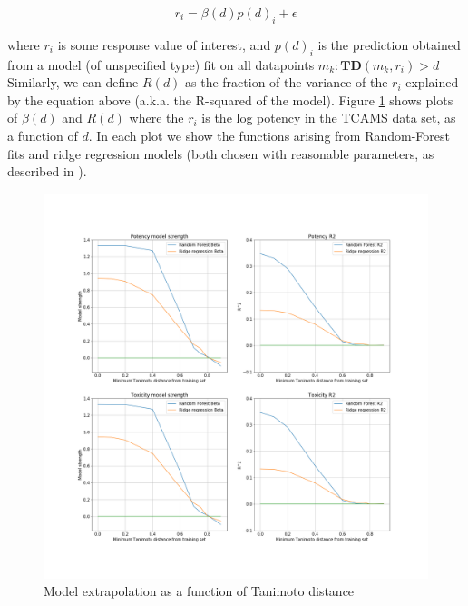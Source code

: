 \documentclass[journal=jacsat,manuscript=article]{achemso}
\begin{document}
\begin{equation}
    r_{i} = \beta(d) p(d)_{i} + \epsilon
\end{equation}

where $r_{i}$ is some response value of interest, and $p(d)_{i}$ is the prediction obtained from a model (of unspecified type) fit on all datapoints $m_{k} : \mathbf{TD}(m_{k}, r_{i}) > d$
\newline
\newline
Similarly, we can define $R(d)$ as the fraction of the variance  of the $r_{i}$ explained by the equation above  (a.k.a. the R-squared of the model).
\newline
\newline
Figure \ref{fig:model_extrap} shows plots of $\beta(d)$ and $R(d)$ where the $r_{i}$ is the log potency in the TCAMS data set, as a function of $d$.  In each plot we show the functions arising from Random-Forest fits and ridge regression models (both chosen with reasonable parameters, as described in \citep{et1:}).

\begin{figure}[h!]
\centering
\includegraphics[width=\textwidth, keepaspectratio]{fig4_str_r2.png}
\caption{Model extrapolation as a function of Tanimoto distance}
\label{fig:model_extrap}
\end{figure}
\end{document}
